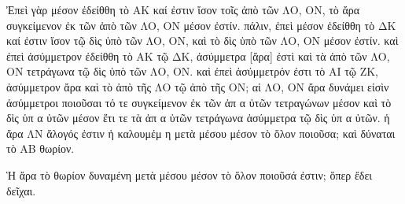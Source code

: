 \begin{Parallel}{}{}
{{\greekfont Ἐπεὶ γὰρ μέσον ἐδείθθη τὸ ΑΚ καί ἐστιν ἴσον τοῖς ἀπὸ τῶν
ΛΟ, ΟΝ, τὸ ἄρα συγκείμενον ἐκ τῶν ἀπὸ τῶν ΛΟ, ΟΝ
μέσον ἐστίν. πάλιν, ἐπεὶ μέσον ἐδείθθη τὸ ΔΚ καί ἐστιν  ἴσον
τῷ δὶς ὑπὸ  τῶν ΛΟ, ΟΝ, καὶ τὸ δὶς ὑπὸ τῶν ΛΟ, ΟΝ
μέσον ἐστίν. καὶ ἐπεὶ ἀσύμμετρον ἐδείθθη τὸ ΑΚ τῷ ΔΚ, ἀσύμμετρα [ἄρα] ἐστὶ καὶ τὰ ἀπὸ τῶν ΛΟ, ΟΝ τετράγωνα
τῷ δὶς ὑπὸ τῶν ΛΟ, ΟΝ. καὶ ἐπεὶ ἀσύμμετρόν ἐστι τὸ ΑΙ τῷ
ΖΚ, ἀσύμμετρον ἄρα καὶ τὸ ἀπὸ τῆς ΛΟ τῷ
ἀπὸ τῆς ΟΝ; αἱ ΛΟ, ΟΝ ἄρα δυνάμει εἰσὶν
ἀσύμμετροι ποιοῦσαι τό τε συγκείμενον ἐκ τῶν ἀπ
α ὐτῶν τετραγώνων μέσον καὶ τὸ δὶς ὑπ α ὐτῶν
μέσον ἔτι τε τὰ ἀπ α ὐτῶν τετράγωνα ἀσύμμετρα τῷ δὶς ὑπ
α ὐτῶν. ἡ ἄρα ΛΝ ἄλογός ἐστιν ἡ καλουμέμ η μετὰ μέσου
μέσον τὸ ὅλον ποιοῦσα; καὶ δύναται τὸ ΑΒ θωρίον.}

{\greekfont Ἡ ἄρα τὸ θωρίον δυναμένη μετὰ μέσου μέσον τὸ ὅλον
ποιοῦσά ἐστιν; ὅπερ ἔδει δεῖχαι.}}

\end{Parallel}
